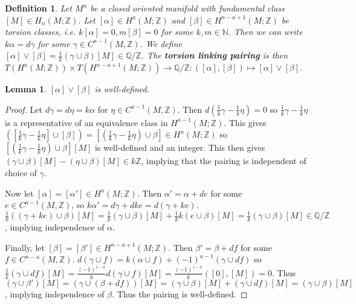 \documentclass{report}
\newtheorem{definition}{Definition}
\newtheorem{lemma}{Lemma}
\begin{document}
\begin{definition}
Let $M^n$ be a closed oriented manifold with fundamental class $[M]\in H_n(M;\mathbb{Z})$. Let $[\alpha]\in H^a(M;\mathbb{Z})$ and $[\beta]\in H^{n-a+1}(M;\mathbb{Z})$ be torsion classes, i.e. $k[\alpha]=0,m[\beta]=0$ for some $k,m\in\mathbb{N}$. Then we can write $k\alpha=d\gamma$ for some $\gamma\in C^{a-1}(M,\mathbb{Z})$. We define $[\alpha]\vee[\beta]=\frac{1}{k}(\gamma\cup\beta)[M]\in\mathbb{Q}/\mathbb{Z}$. The \textbf{torsion linking pairing} is then $T(H^a(M;\mathbb{Z}))\times T(H^{n-a+1}(M;\mathbb{Z}))\to\mathbb{Q}/\mathbb{Z}:([\alpha],[\beta])\mapsto[\alpha]\vee[\beta]$.
\end{definition}
\begin{lemma}
$[\alpha]\vee[\beta]$ is well-defined.
\end{lemma}
\begin{proof}
Let $d\gamma=d\eta=k\alpha$ for $\eta\in C^{a-1}(M,\mathbb{Z})$. Then $d(\frac{1}{k}\gamma-\frac{1}{k}\eta)=0$ so $\frac{1}{k}\gamma-\frac{1}{k}\eta$ is a representative of an equivalence class in $H^{a-1}(M;\mathbb{Z})$. This gives $([\frac{1}{k}\gamma-\frac{1}{k}\eta]\cup[\beta])=[(\frac{1}{k}\gamma-\frac{1}{k}\eta)\cup\beta]\in H^{n}(M;\mathbb{Z})$ so $[(\frac{1}{k}\gamma-\frac{1}{k}\eta)\cup\beta][M]$ is well-defined and an integer. This then gives $(\gamma\cup\beta)[M]-(\eta\cup\beta)[M]\in k\mathbb{Z}$, implying that the pairing is independent of choice of $\gamma$.

\noindent Now let $[\alpha]=[\alpha']\in H^a(M;\mathbb{Z})$. Then $\alpha'=\alpha+de$ for some $e\in C^{a-1}(M,\mathbb{Z})$, so $k\alpha'=d\gamma+dke=d(\gamma+ke)$. $\frac{1}{k}((\gamma+ke)\cup\beta)[M]=\frac{1}{k}(\gamma\cup\beta)[M]+\frac{1}{k}k(e\cup\beta)[M]=\frac{1}{k}(\gamma\cup\beta)[M] \in \mathbb{Q}/\mathbb{Z}$, implying independence of $\alpha$.

\noindent Finally, let $[\beta]=[\beta']\in H^{n-a+1}(M;\mathbb{Z})$. Then $\beta'=\beta+df$ for some $f\in C^{n-a}(M,\mathbb{Z})$. $d(\gamma\cup f)=k(\alpha\cup f)+(-1)^{a-1}(\gamma\cup df)$ so $\frac{1}{k}(\gamma\cup df)[M]=\frac{(-1)^{1-a}}{k}d(\gamma\cup f)[M]=\frac{(-1)^{1-a}}{k}([0],[M])=0$. Thus $(\gamma\cup\beta')[M]=(\gamma\cup(\beta+df))[M]=(\gamma\cup\beta)[M]+(\gamma\cup df)[M]=(\gamma\cup\beta)[M]$, implying independence of $\beta$. Thus the pairing is well-defined.
\end{proof}
\end{document}
